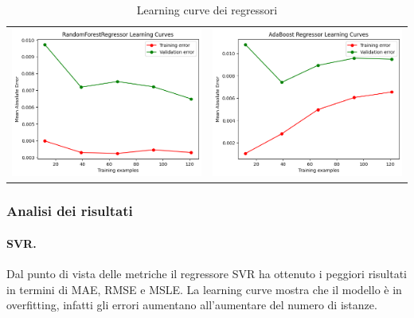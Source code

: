 \begin{table}[H]
\begin{tabular}{c c}
        \includegraphics[scale=0.3]{images/RandomForestRegressor_lc.png} & \includegraphics[scale=0.3]{images/AdaBoostRegressor_lc.png} \\
    \end{tabular}
    \caption{Learning curve dei regressori}
    \label{tab:lc}
\end{table}

\subsubsection{Analisi dei risultati}


    \paragraph{\textbf{SVR}.}
    Dal punto di vista delle metriche il regressore SVR ha ottenuto i peggiori risultati in termini di MAE, RMSE e MSLE. La learning curve mostra che il modello è in overfitting, infatti gli errori aumentano all'aumentare del numero di istanze.
   
